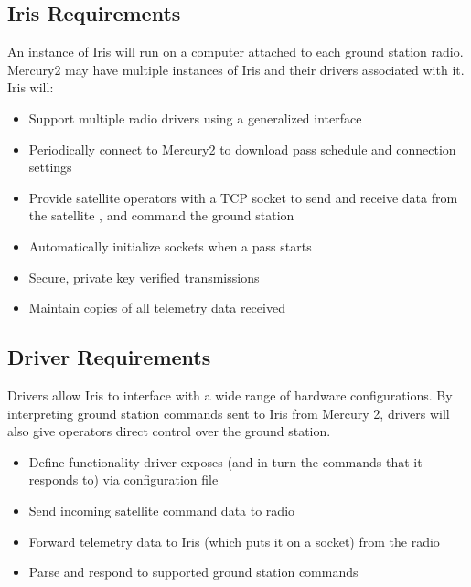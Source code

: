 \documentclass{mxl-note}
\begin{document}
\subsection{Iris Requirements}
An instance of Iris will run on a computer attached to each ground station radio. Mercury2 may have multiple instances of Iris and their drivers associated with it. Iris will:
\begin{itemize}
	\item Support multiple radio drivers using a generalized interface
	\item Periodically connect to Mercury2 to download pass schedule and connection settings
	\item Provide satellite operators with a TCP socket to send and receive data from the satellite , and command the ground station
	\item Automatically initialize sockets when a pass starts
	\item Secure, private key verified transmissions
	\item Maintain copies of all telemetry data received
\end{itemize}

\subsection{Driver Requirements}
Drivers allow Iris to interface with a wide range of hardware configurations. By interpreting ground station commands sent to Iris from Mercury 2, drivers will also give operators direct control over the ground station.
\begin{itemize}
	\item Define functionality driver exposes (and in turn the commands that it responds to) via configuration file
	\item Send incoming satellite command data to radio
	\item Forward telemetry data to Iris (which puts it on a socket) from the radio
	\item Parse and respond to supported ground station commands
\end{itemize}

\clearpage 
\end{document}

